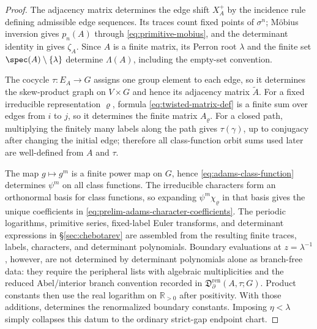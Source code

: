 \begin{proof}
  The adjacency matrix determines the edge shift \(X_A^+\) by the
  incidence rule defining admissible edge sequences. Its traces count
  fixed points of \(\sigma^n\); M\"obius inversion gives
  \(p_n(A)\) through \eqref{eq:primitive-mobius}, and the determinant
  identity in  gives \(\zeta_A\).
  Since \(A\) is a finite matrix, its Perron root \(\lambda\) and the
  finite set \(\spec(A)\setminus\{\lambda\}\) determine
  \(\Lambda(A)\), including the empty-set convention.

  The cocycle \(\tau:E_A\to G\) assigns one group element to each edge,
  so it determines the skew-product graph on \(V\times G\) and hence its
  adjacency matrix \(\widetilde A\). For a fixed irreducible
  representation \(\varrho\), formula \eqref{eq:twisted-matrix-def}
  is a finite sum over edges from \(i\) to \(j\), so it determines the
  finite matrix \(A_\varrho\). For a closed path, multiplying the finitely
  many labels along the path gives \(\tau(\gamma)\), up to conjugacy
  after changing the initial edge; therefore all class-function orbit
  sums used later are well-defined from \(A\) and \(\tau\).

  The map \(g\mapsto g^m\) is a finite power map on \(G\), hence
  \eqref{eq:adams-class-function} determines \(\psi^m\) on all class
  functions. The irreducible characters form an orthonormal basis for
  class functions, so expanding \(\psi^m\chi_\varrho\) in that basis gives
  the unique coefficients in
  \eqref{eq:prelim-adams-character-coefficients}. The periodic
  logarithms, primitive series, fixed-label Euler transforms, and
  determinant expressions in \S\ref{sec:chebotarev} are assembled from
  the resulting finite traces, labels, characters, and determinant
  polynomials.  Boundary evaluations at \(z=\lambda^{-1}\), however, are
  not determined by determinant polynomials alone as branch-free data:
  they require the peripheral lists with algebraic multiplicities and the
  reduced Abel/interior branch convention recorded in
  \(\mathfrak D_{\partial}^{\mathrm{ren}}(A,\tau;G)\).  Product constants
  then use the real logarithm on \(\mathbb R_{>0}\) after positivity.  With those
  additions,  determines
  the renormalized boundary constants.  Imposing \(\eta<\lambda\) simply
  collapses this datum to the ordinary strict-gap endpoint chart.
\end{proof}

